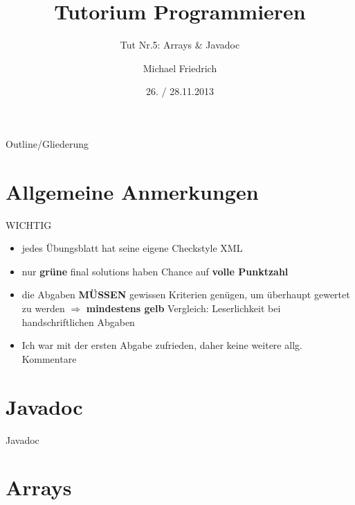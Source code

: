 \documentclass[18pt]{beamer}
\title[Prog Tut Nr. 5]{Tutorium Programmieren}
\subtitle{Tut Nr.5: Arrays & Javadoc}
\author{Michael Friedrich}
\date{26. / 28.11.2013}
\institute{Institut f\"ur theoretische Informatik}
\begin{document}

\begin{frame}
	\titlepage
\end{frame}

\begin{frame}{Outline/Gliederung}
	\tableofcontents
\end{frame}

\section{Allgemeine Anmerkungen}
\begin{frame}[fragile]{WICHTIG}
\begin{itemize}
\item jedes Übungsblatt hat seine eigene Checkstyle XML
\item nur \textbf{grüne} final solutions haben Chance auf \textbf{volle Punktzahl}
\item die Abgaben \textbf{MÜSSEN} gewissen Kriterien genügen, um überhaupt gewertet zu werden \newline
$\Rightarrow$ \textbf{mindestens gelb} \newline
Vergleich: Leserlichkeit bei handschriftlichen Abgaben 
\item Ich war mit der ersten Abgabe zufrieden, daher keine weitere allg. Kommentare
\end{itemize}
\end{frame}


\section{Javadoc}
\begin{frame}[fragile]{Javadoc}
\end{frame}

\section{Arrays}
\end{document}
